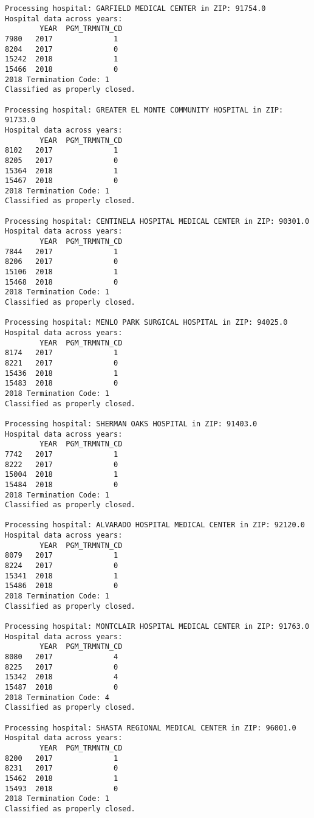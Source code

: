 \documentclass[
  letterpaper,
  DIV=11,
  numbers=noendperiod]{scrartcl}
\begin{document}
\begin{verbatim}
Processing hospital: GARFIELD MEDICAL CENTER in ZIP: 91754.0
Hospital data across years:
        YEAR  PGM_TRMNTN_CD
7980   2017              1
8204   2017              0
15242  2018              1
15466  2018              0
2018 Termination Code: 1
Classified as properly closed.

Processing hospital: GREATER EL MONTE COMMUNITY HOSPITAL in ZIP: 91733.0
Hospital data across years:
        YEAR  PGM_TRMNTN_CD
8102   2017              1
8205   2017              0
15364  2018              1
15467  2018              0
2018 Termination Code: 1
Classified as properly closed.

Processing hospital: CENTINELA HOSPITAL MEDICAL CENTER in ZIP: 90301.0
Hospital data across years:
        YEAR  PGM_TRMNTN_CD
7844   2017              1
8206   2017              0
15106  2018              1
15468  2018              0
2018 Termination Code: 1
Classified as properly closed.

Processing hospital: MENLO PARK SURGICAL HOSPITAL in ZIP: 94025.0
Hospital data across years:
        YEAR  PGM_TRMNTN_CD
8174   2017              1
8221   2017              0
15436  2018              1
15483  2018              0
2018 Termination Code: 1
Classified as properly closed.

Processing hospital: SHERMAN OAKS HOSPITAL in ZIP: 91403.0
Hospital data across years:
        YEAR  PGM_TRMNTN_CD
7742   2017              1
8222   2017              0
15004  2018              1
15484  2018              0
2018 Termination Code: 1
Classified as properly closed.

Processing hospital: ALVARADO HOSPITAL MEDICAL CENTER in ZIP: 92120.0
Hospital data across years:
        YEAR  PGM_TRMNTN_CD
8079   2017              1
8224   2017              0
15341  2018              1
15486  2018              0
2018 Termination Code: 1
Classified as properly closed.

Processing hospital: MONTCLAIR HOSPITAL MEDICAL CENTER in ZIP: 91763.0
Hospital data across years:
        YEAR  PGM_TRMNTN_CD
8080   2017              4
8225   2017              0
15342  2018              4
15487  2018              0
2018 Termination Code: 4
Classified as properly closed.

Processing hospital: SHASTA REGIONAL MEDICAL CENTER in ZIP: 96001.0
Hospital data across years:
        YEAR  PGM_TRMNTN_CD
8200   2017              1
8231   2017              0
15462  2018              1
15493  2018              0
2018 Termination Code: 1
Classified as properly closed.


\end{verbatim}
\end{document}
